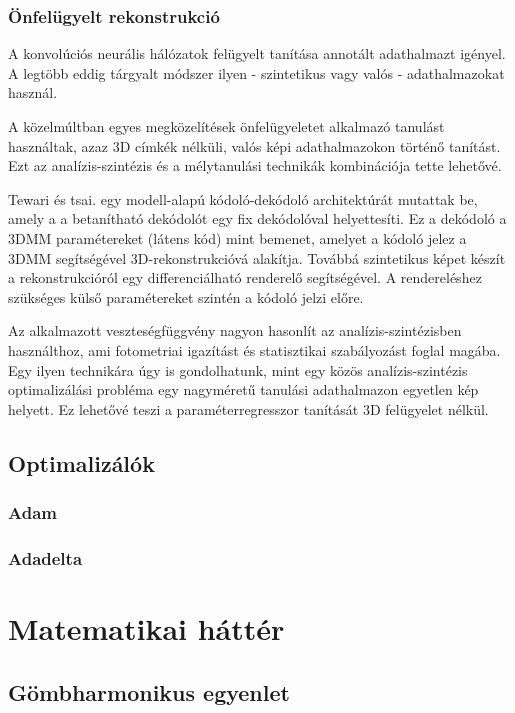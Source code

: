 \documentclass[12pt,a4]{article}
\begin{document}
	\subsubsection{Önfelügyelt rekonstrukció}
	A konvolúciós neurális hálózatok felügyelt tanítása annotált adathalmazt igényel. A legtöbb
	eddig tárgyalt módszer ilyen - szintetikus vagy valós - adathalmazokat használ.
	
	\cite{3dmm}A közelmúltban egyes megközelítések önfelügyeletet alkalmazó
	tanulást használtak, azaz 3D címkék nélküli, valós képi adathalmazokon történő tanítást.
	Ezt az analízis-szintézis és a mélytanulási technikák kombinációja tette lehetővé.
	
	\cite{tewari}Tewari és tsai. egy modell-alapú kódoló-dekódoló architektúrát mutattak be, amely a
	a betanítható dekódolót egy fix dekódolóval helyettesíti. Ez a dekódoló a 3DMM paramétereket (látens kód)
	mint bemenet, amelyet a kódoló jelez a 3DMM segítségével 3D-rekonstrukcióvá alakítja.
	Továbbá szintetikus képet készít a rekonstrukcióról egy differenciálható renderelő segítségével.
	A rendereléshez szükséges külső paramétereket szintén a kódoló jelzi előre. 
	
	\cite{3dmm}Az alkalmazott veszteségfüggvény nagyon hasonlít az analízis-szintézisben használthoz, ami fotometriai igazítást és statisztikai szabályozást foglal magába. Egy ilyen technikára úgy is gondolhatunk, mint egy közös analízis-szintézis optimalizálási probléma egy nagyméretű tanulási
	adathalmazon egyetlen kép helyett. Ez lehetővé teszi a paraméterregresszor tanítását 3D felügyelet nélkül.

    \subsection{Optimalizálók}
        \subsubsection{Adam}
        \subsubsection{Adadelta}
    
    \section{Matematikai háttér}
        \subsection{Gömbharmonikus egyenlet}
\end{document}
